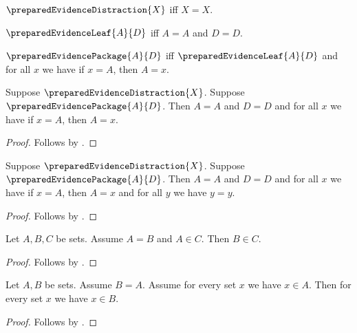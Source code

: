 \begin{definition}\label{prepared_evidence_distraction}
    $\preparedEvidenceDistraction{X}$ iff $X=X$.
\end{definition}

\begin{definition}\label{prepared_evidence_leaf}
    $\preparedEvidenceLeaf{A}{D}$ iff $A=A$ and $D=D$.
\end{definition}

\begin{definition}\label{prepared_evidence_package}
    $\preparedEvidencePackage{A}{D}$ iff $\preparedEvidenceLeaf{A}{D}$ and
    for all $x$ we have if $x=A$, then $A=x$.
\end{definition}

\begin{proposition}\label{prepared_evidence_closed}
    Suppose $\preparedEvidenceDistraction{X}$.
    Suppose $\preparedEvidencePackage{A}{D}$.
    Then $A=A$ and $D=D$ and for all $x$ we have if $x=A$, then $A=x$.
\end{proposition}
\begin{proof}
    Follows by \auto.
\end{proof}

\begin{proposition}\label{prepared_evidence_partial}
    Suppose $\preparedEvidenceDistraction{X}$.
    Suppose $\preparedEvidencePackage{A}{D}$.
    Then $A=A$ and $D=D$ and
    for all $x$ we have if $x=A$, then $A=x$ and
    for all $y$ we have $y=y$.
\end{proposition}
\begin{proof}
    Follows by \auto.
\end{proof}

\begin{proposition}\label{prepared_evidence_transport}
    Let $A,B,C$ be sets.
    Assume $A=B$ and $A\in C$.
    Then $B\in C$.
\end{proposition}
\begin{proof}
    Follows by \auto.
\end{proof}

\begin{proposition}\label{prepared_evidence_transport_binder}
    Let $A,B$ be sets.
    Assume $B=A$.
    Assume for every set $x$ we have $x\in A$.
    Then for every set $x$ we have $x\in B$.
\end{proposition}
\begin{proof}
    Follows by \auto.
\end{proof}
